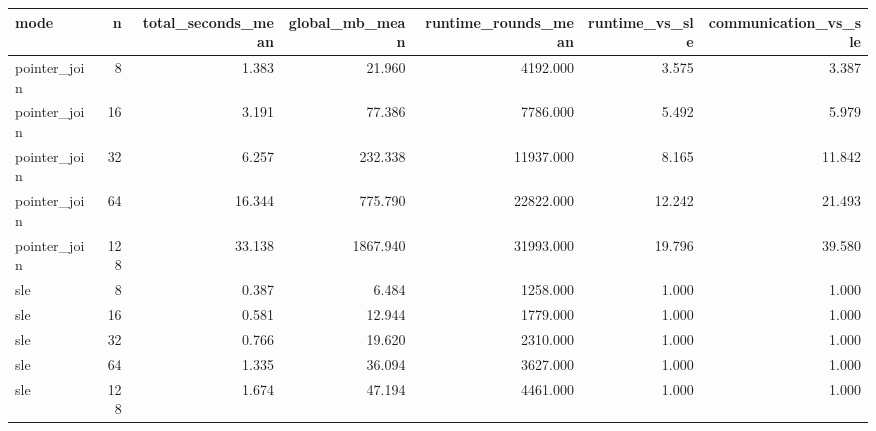 \begin{tabular}{lrrrrrr}
\toprule
mode & n & total_seconds_mean & global_mb_mean & runtime_rounds_mean & runtime_vs_sle & communication_vs_sle \\
\midrule
pointer_join & 8 & 1.383 & 21.960 & 4192.000 & 3.575 & 3.387 \\
pointer_join & 16 & 3.191 & 77.386 & 7786.000 & 5.492 & 5.979 \\
pointer_join & 32 & 6.257 & 232.338 & 11937.000 & 8.165 & 11.842 \\
pointer_join & 64 & 16.344 & 775.790 & 22822.000 & 12.242 & 21.493 \\
pointer_join & 128 & 33.138 & 1867.940 & 31993.000 & 19.796 & 39.580 \\
sle & 8 & 0.387 & 6.484 & 1258.000 & 1.000 & 1.000 \\
sle & 16 & 0.581 & 12.944 & 1779.000 & 1.000 & 1.000 \\
sle & 32 & 0.766 & 19.620 & 2310.000 & 1.000 & 1.000 \\
sle & 64 & 1.335 & 36.094 & 3627.000 & 1.000 & 1.000 \\
sle & 128 & 1.674 & 47.194 & 4461.000 & 1.000 & 1.000 \\
\bottomrule
\end{tabular}
